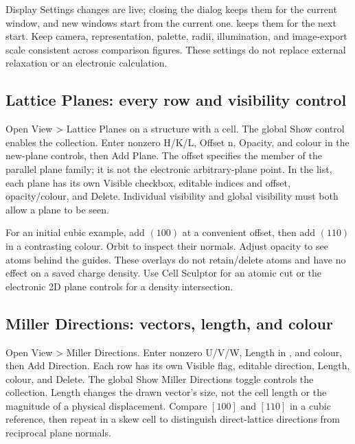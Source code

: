 Display Settings changes are live; closing the dialog keeps them for the current window, and new windows start from the current one.  keeps them for the next start. Keep camera, representation, palette, radii, illumination, and image-export scale consistent across comparison figures. These settings do not replace external relaxation or an electronic calculation.

\subsection{Lattice Planes: every row and visibility control}
Open View > Lattice Planes on a structure with a cell. The global Show control enables the collection. Enter nonzero H/K/L, Offset n, Opacity, and colour in the new-plane controls, then Add Plane. The offset specifies the member of the parallel plane family; it is not the electronic arbitrary-plane point. In the list, each plane has its own Visible checkbox, editable indices and offset, opacity/colour, and Delete. Individual visibility and global visibility must both allow a plane to be seen.

For an initial cubic example, add $(100)$ at a convenient offset, then add $(110)$ in a contrasting colour. Orbit to inspect their normals. Adjust opacity to see atoms behind the guides. These overlays do not retain/delete atoms and have no effect on a saved charge density. Use Cell Sculptor for an atomic cut or the electronic 2D plane controls for a density intersection.

\subsection{Miller Directions: vectors, length, and colour}
Open View > Miller Directions. Enter nonzero U/V/W, Length in \angstrom, and colour, then Add Direction. Each row has its own Visible flag, editable direction, Length, colour, and Delete. The global Show Miller Directions toggle controls the collection. Length changes the drawn vector's size, not the cell length or the magnitude of a physical displacement. Compare $[100]$ and $[110]$ in a cubic reference, then repeat in a skew cell to distinguish direct-lattice directions from reciprocal plane normals.

